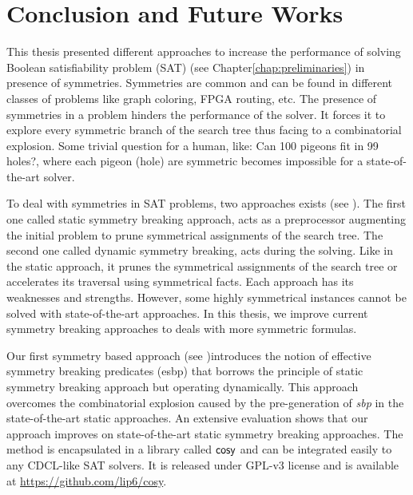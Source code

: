 \chapter{Conclusion and Future Works}\label{chap:conclu}



This thesis presented different approaches to increase the performance of solving 
Boolean satisfiability problem (SAT) (see Chapter\ref{chap:preliminaries}) in presence of symmetries. 
Symmetries are common and  can be found in different classes of problems like
graph coloring, FPGA routing, etc.
The presence of symmetries in a problem hinders the performance of the solver. It forces
it to explore every symmetric branch of the search tree thus facing to a combinatorial explosion.
Some trivial question for a human, like: Can 100 pigeons fit in 99 holes?,
where each pigeon (hole) are symmetric becomes impossible for a state-of-the-art solver. 


To deal with symmetries in SAT problems, two approaches exists (see ).
The first one called static symmetry breaking approach, acts as a preprocessor augmenting the initial
problem to prune symmetrical assignments of the search tree. The second one called dynamic symmetry breaking,
acts during the solving. Like in the static approach, it prunes the symmetrical assignments of the 
search tree or accelerates its traversal using symmetrical facts.
Each approach has its weaknesses and strengths. However, some highly symmetrical instances cannot be solved with
state-of-the-art approaches. In this thesis, we improve current symmetry breaking approaches to 
deals with more symmetric formulas.


%
%

Our first symmetry based approach (see )introduces the notion of effective symmetry breaking predicates (esbp) that borrows the principle of static symmetry breaking approach but operating dynamically\cite{metin2018cdclsym}.
This approach overcomes the combinatorial explosion caused by the pre-generation of \textit{sbp} in the state-of-the-art static approaches.
An extensive evaluation shows that our approach improves on state-of-the-art static 
symmetry breaking approaches.
The method is encapsulated in a library called $\textsf{cosy}$ and can be integrated easily to any
CDCL-like SAT solvers. It is released under GPL-v3 license and is available at \url{https://github.com/lip6/cosy}.

